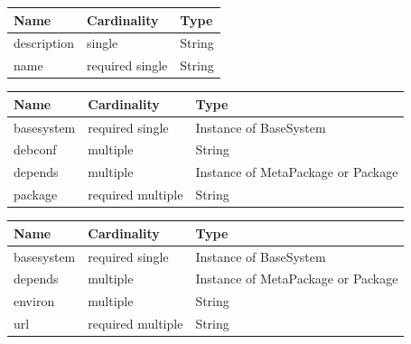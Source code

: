 \begin{table}[!h]
   \begin{center}
         \label{tab:main_class_tag}
	\begin{tabular}{p{3cm}p{3cm}p{4cm}}
	\textbf{Name}  & \textbf{Cardinality}  & \textbf{Type}\\
	\hline
	description    & single                & String       \\
	name           & required single       & String       \\
	\end{tabular} 
   \end{center}
\end{table}

\begin{table}[!h]
   \begin{center}
         \label{tab:main_class_debian}
	\begin{tabular}{p{3cm}p{3cm}p{6cm}}
	\textbf{Name}  & \textbf{Cardinality}  & \textbf{Type}\\
	\hline
	basesystem     & required single       & Instance of BaseSystem       \\
	debconf        & multiple              & String       \\
	depends        & multiple              & Instance of MetaPackage  or Package      \\
	package        & required multiple     & String      \\
	\end{tabular} 
   \end{center}
\end{table}

\begin{table}[!h]
   \begin{center}
         \label{tab:main_class_tar}
	\begin{tabular}{p{3cm}p{3cm}p{6cm}}
	\textbf{Name}  & \textbf{Cardinality}  & \textbf{Type}\\
	\hline
	basesystem     & required single       & Instance of BaseSystem       \\
	depends        & multiple              & Instance of MetaPackage or Package      \\
	environ        & multiple              & String       \\
	url            & required multiple     & String      \\
	\end{tabular} 
   \end{center}
\end{table}

